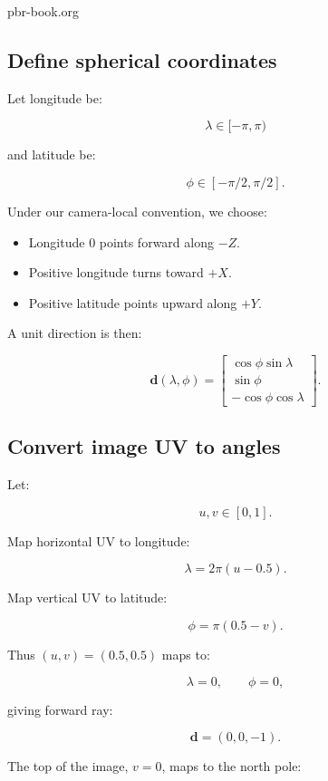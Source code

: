 pbr-book.org

\subsection{Define spherical coordinates}\label{02-foundations-ii-ch035-define-spherical-coordinates}

Let longitude be:

\[ \lambda\in[-\pi,\pi) \]

and latitude be:

\[ \phi\in[-\pi/2,\pi/2]. \]

Under our camera-local convention, we choose:

\begin{itemize}
\tightlist
\item
  Longitude \(0\) points forward along \(-Z\).
\item
  Positive longitude turns toward \(+X\).
\item
  Positive latitude points upward along \(+Y\).
\end{itemize}

A unit direction is then:

\[ \boxed{ \mathbf d(\lambda,\phi)= \begin{bmatrix} \cos\phi\sin\lambda\\ \sin\phi\\ -\cos\phi\cos\lambda \end{bmatrix}. } \]

\subsection{Convert image UV to angles}\label{02-foundations-ii-ch035-convert-image-uv-to-angles}

Let:

\[ u,v\in[0,1]. \]

Map horizontal UV to longitude:

\[ \boxed{ \lambda=2\pi(u-0.5). } \]

Map vertical UV to latitude:

\[ \boxed{ \phi=\pi(0.5-v). } \]

Thus \((u,v)=(0.5,0.5)\) maps to:

\[ \lambda=0,\qquad\phi=0, \]

giving forward ray:

\[ \boxed{\mathbf d=(0,0,-1)}. \]

The top of the image, \(v=0\), maps to the north pole:

